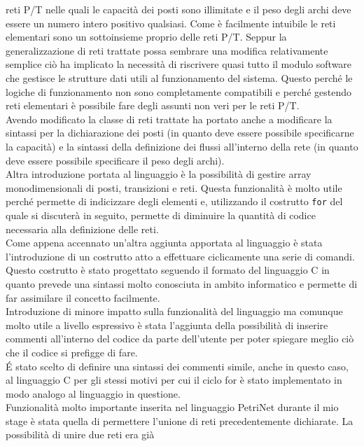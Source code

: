 \documentclass[italian,12pt]{report}
\begin{document}
 reti P/T nelle quali le capacità dei posti sono illimitate e il peso degli archi deve essere un numero
 intero positivo qualsiasi. Come è facilmente intuibile le reti elementari sono un sottoinsieme proprio
 delle reti P/T. Seppur la generalizzazione di reti trattate possa sembrare una modifica relativamente 
 semplice ciò ha implicato la necessità di riscrivere quasi tutto il modulo software che gestisce le 
 strutture dati utili al funzionamento del sistema. Questo perché le logiche di funzionamento non 
 sono completamente compatibili e perché gestendo reti elementari è possibile fare degli assunti
 non veri per le reti P/T. \\
 Avendo modificato la classe di reti trattate ha portato anche a modificare la sintassi per 
 la dichiarazione dei posti (in quanto deve essere possibile specificarne la capacità) e la sintassi 
 della definizione dei flussi all'interno della rete (in quanto deve essere possibile specificare il 
 peso degli archi). \\
 Altra introduzione portata al linguaggio è la possibilità di gestire array monodimensionali 
 di posti, transizioni e reti. Questa funzionalità è molto utile perché permette di indicizzare 
 degli elementi e, utilizzando il costrutto {\tt for} del quale si discuterà in seguito, permette di diminuire 
 la quantità di codice necessaria alla definizione delle reti. \\
 Come appena accennato un'altra aggiunta apportata al linguaggio è stata l'introduzione di un 
 costrutto atto a effettuare ciclicamente una serie di comandi. Questo costrutto è stato progettato 
 seguendo il formato del linguaggio C in quanto prevede una sintassi molto conosciuta in ambito 
 informatico e permette di far assimilare il concetto facilmente. \\
 Introduzione di minore impatto sulla funzionalità del linguaggio ma comunque molto utile 
 a livello espressivo è stata l'aggiunta della possibilità di inserire commenti all'interno del 
 codice da parte dell'utente per poter spiegare meglio ciò che il codice si prefigge di fare. \\
 \'E stato scelto di definire una sintassi dei commenti simile, anche in questo caso, 
 al linguaggio C per gli stessi motivi per cui il ciclo for è stato implementato in modo analogo al 
 linguaggio in questione. \\
 Funzionalità molto importante inserita nel linguaggio PetriNet durante il mio stage è stata quella 
 di permettere l'unione di reti precedentemente dichiarate. La possibilità di unire due reti era già 
\end{document}
